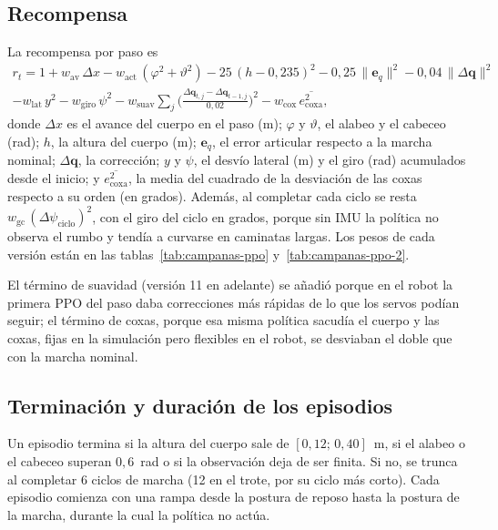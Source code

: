 \subsection{Recompensa}

La recompensa por paso es
\begin{multline}
    r_t = 1 + w_{\text{av}}\,\Delta x - w_{\text{act}}\,(\varphi^2+\vartheta^2)
    - 25\,(h-0{,}235)^2 - 0{,}25\,\lVert\mathbf{e}_q\rVert^2 - 0{,}04\,\lVert\Delta\mathbf{q}\rVert^2 \\
    - w_{\text{lat}}\,y^2 - w_{\text{giro}}\,\psi^2
    - w_{\text{suav}}\sum_j\Big(\frac{\Delta\mathbf{q}_{t,j}-\Delta\mathbf{q}_{t-1,j}}{0{,}02}\Big)^2
    - w_{\text{cox}}\,\overline{e_{\text{coxa}}^2},
    \label{eq:recompensa-real}
\end{multline}
donde $\Delta x$ es el avance del cuerpo en el paso (m); $\varphi$ y $\vartheta$,
el alabeo y el cabeceo (rad); $h$, la altura del cuerpo (m); $\mathbf{e}_q$, el
error articular respecto a la marcha nominal; $\Delta\mathbf{q}$, la corrección;
$y$ y $\psi$, el desvío lateral (m) y el giro (rad) acumulados desde el inicio;
y $\overline{e_{\text{coxa}}^2}$, la media del cuadrado de la desviación de las
coxas respecto a su orden (en grados). Además, al completar cada ciclo se resta
$w_{\text{gc}}\,(\Delta\psi_{\text{ciclo}})^2$, con el giro del ciclo en grados,
porque sin IMU la política no observa el rumbo y tendía a curvarse en caminatas
largas. Los pesos de cada versión están en las
tablas~\ref{tab:campanas-ppo} y~\ref{tab:campanas-ppo-2}.

El término de suavidad (versión 11 en adelante) se añadió porque en el robot la
primera PPO del paso daba correcciones más rápidas de lo que los servos podían
seguir; el término de coxas, porque esa misma política sacudía el cuerpo y las
coxas, fijas en la simulación pero flexibles en el robot, se desviaban el doble
que con la marcha nominal.

\subsection{Terminación y duración de los episodios}

Un episodio termina si la altura del cuerpo sale de $[0{,}12;\,0{,}40]$~m, si
el alabeo o el cabeceo superan $0{,}6$~rad o si la observación deja de ser
finita. Si no, se trunca al completar 6 ciclos de marcha (12 en el trote, por
su ciclo más corto). Cada episodio comienza con una rampa desde la postura de
reposo hasta la postura de la marcha, durante la cual la política no actúa.

